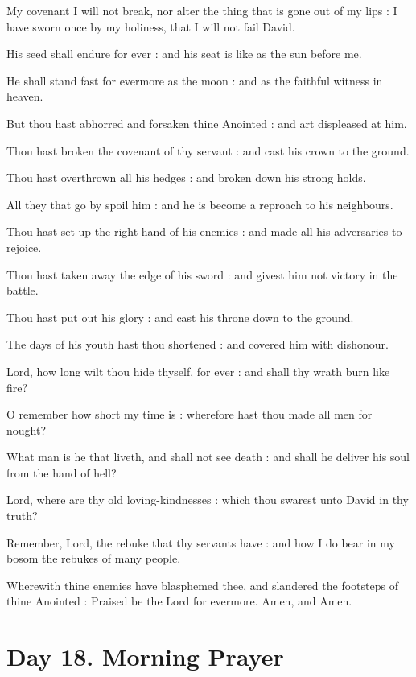 My covenant I will not break, nor alter the thing that is gone out of my lips : I have sworn once by my holiness, that I will not fail David.\par
{}His seed shall endure for ever : and his seat is like as the sun before me.\par
{}He shall stand fast for evermore as the moon : and as the faithful witness in heaven.\par
{}But thou hast abhorred and forsaken thine Anointed : and art displeased at him.\par
{}Thou hast broken the covenant of thy servant : and cast his crown to the ground.\par
{}Thou hast overthrown all his hedges : and broken down his strong holds.\par
{}All they that go by spoil him : and he is become a reproach to his neighbours.\par
{}Thou hast set up the right hand of his enemies : and made all his adversaries to rejoice.\par
{}Thou hast taken away the edge of his sword : and givest him not victory in the battle.\par
{}Thou hast put out his glory : and cast his throne down to the ground.\par
{}The days of his youth hast thou shortened : and covered him with dishonour.\par
{}Lord, how long wilt thou hide thyself, for ever : and shall thy wrath burn like fire?\par
{}O remember how short my time is : wherefore hast thou made all men for nought?\par
{}What man is he that liveth, and shall not see death : and shall he deliver his soul from the hand of hell?\par
{}Lord, where are thy old loving-kindnesses : which thou swarest unto David in thy truth?\par
{}Remember, Lord, the rebuke that thy servants have : and how I do bear in my bosom the rebukes of many people.\par
{}Wherewith thine enemies have blasphemed thee, and slandered the footsteps of thine Anointed : Praised be the Lord for evermore. Amen, and Amen.\par

\section*{Day 18. Morning Prayer}


